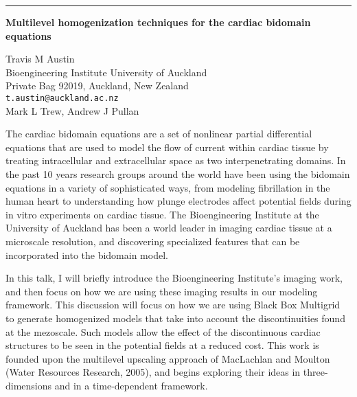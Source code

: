 \documentclass[twosided]{report}
\begin{document}
	\begin{center} \rule{6in}{1pt} \end{center}

\newpage

\begin{center}
{\large			%
{\bf Multilevel homogenization techniques for the cardiac bidomain equations}}

	Travis M Austin \\
	Bioengineering Institute University of Auckland \\
	Private Bag 92019, \quad Auckland, New Zealand \\
	{\tt t.austin@auckland.ac.nz} \\
	Mark L Trew, Andrew J Pullan
\end{center}
The cardiac bidomain equations are a set of nonlinear
partial differential equations that are used to model the
flow of current within cardiac tissue by treating
intracellular and extracellular space as two
interpenetrating domains. In the past 10 years research
groups around the world have been using the bidomain
equations in a variety of sophisticated ways, from modeling
fibrillation in the human heart to understanding how plunge
electrodes affect potential fields during in vitro
experiments on cardiac tissue. The Bioengineering Institute
at the University of Auckland has been a world leader in
imaging cardiac tissue at a microscale resolution, and
discovering specialized features that can be incorporated
into the bidomain model.

In this talk, I will briefly
introduce the Bioengineering Institute's imaging work, and
then focus on how we are using these imaging results in our
modeling framework. This discussion will focus on how we
are using Black Box Multigrid to generate homogenized models
that take into account the discontinuities found at the
mezoscale. Such models allow the effect of the discontinuous
cardiac structures to be seen in the potential fields at a
reduced cost. This work is founded upon the multilevel
upscaling approach of MacLachlan and Moulton (Water
Resources Research, 2005), and begins exploring their ideas
in three-dimensions and in a time-dependent framework.
\end{document}
